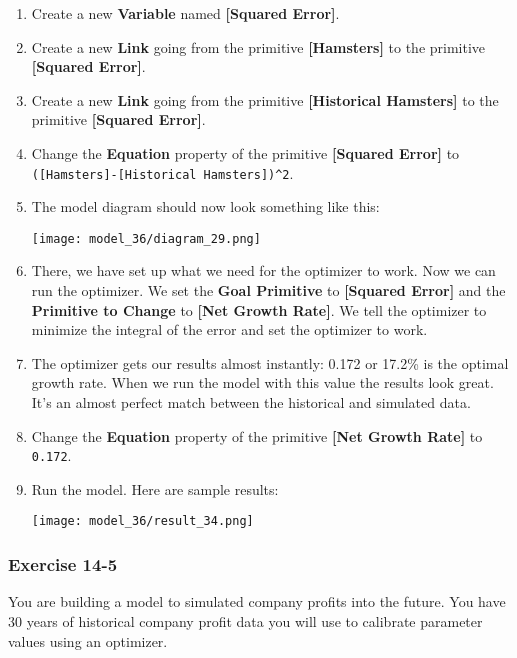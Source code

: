\documentclass[]{memoir}
\makeatletter
\def\maxwidth{\ifdim\Gin@nat@width>\linewidth\linewidth
\else\Gin@nat@width\fi}
\let\Oldincludegraphics\includegraphics
\renewcommand{\includegraphics}[1]{\Oldincludegraphics[width=\maxwidth]{#1}}
\newcommand{\p}[1]{\textbf{{[}#1{]}}}
\newcommand{\e}[1]{\texttt{#1}}
\renewcommand{\a}[1]{\textbf{#1}}
\makeatother
\begin{document}
\begin{oframed}
\begin{enumerate}
\item Create a new \a{Variable} named \p{Squared Error}.
\item Create a new \a{Link} going from the primitive \p{Hamsters} to the primitive \p{Squared Error}.
\item Create a new \a{Link} going from the primitive \p{Historical Hamsters} to the primitive \p{Squared Error}.
\item  Change the \a{Equation} property of the primitive \p{Squared Error} to \e{([Hamsters]-[Historical Hamsters])\^{}2}.
\item The model diagram should now look something like this: \par \begin{minipage}{\linewidth}  \centering \texttt{[image: model\_36/diagram\_29.png]}
\end{minipage}
\item 

There, we have set up what we need for the optimizer to work. Now we can run the optimizer. We set the \textbf{Goal Primitive} to \p{Squared Error} and the \textbf{Primitive to Change} to \p{Net Growth Rate}. We tell the optimizer to minimize the integral of the error and set the optimizer to work.


\item 

The optimizer gets our results almost instantly: 0.172 or 17.2\% is the optimal growth rate. When we run the model with this value the results look great. It's an almost perfect match between the historical and simulated data.


\item  Change the \a{Equation} property of the primitive \p{Net Growth Rate} to \e{0.172}.
\item Run the model. Here are sample results:\par \begin{minipage}{\linewidth}  \centering \texttt{[image: model\_36/result\_34.png]}
\end{minipage}

\end{enumerate} \end{oframed}

\subsubsection{Exercise 14-5}

You are building a model to simulated company profits into the future.
You have 30 years of historical company profit data you will use to
calibrate parameter values using an optimizer.
\end{document}
